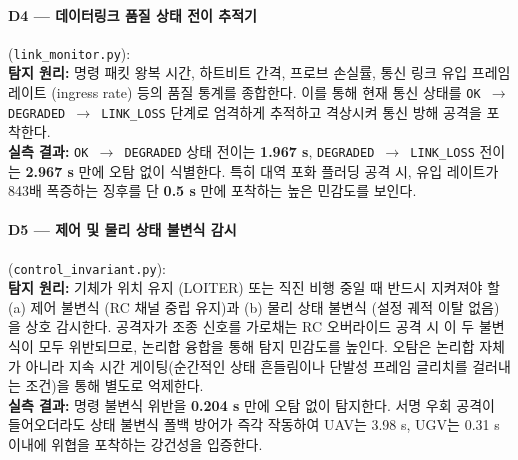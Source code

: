 \paragraph{\textbf{D4 --- 데이터링크 품질 상태 전이 추적기}} (\texttt{link\_monitor.py}): ~\\
\textbf{탐지 원리:} 명령 패킷 왕복 시간, 하트비트 간격, 프로브 손실률, 통신 링크 유입 프레임 레이트 (ingress rate) 등의 품질 통계를 종합한다. 이를 통해 현재 통신 상태를 \texttt{OK $\to$ DEGRADED $\to$ LINK\_LOSS} 단계로 엄격하게 추적하고 격상시켜 통신 방해 공격을 포착한다.\\
\textbf{실측 결과:} \texttt{OK $\to$ DEGRADED} 상태 전이는 \textbf{1.967 s}, \texttt{DEGRADED $\to$ LINK\_LOSS} 전이는 \textbf{2.967 s} 만에 오탐 없이 식별한다. 특히 대역 포화 플러딩 공격 시, 유입 레이트가 843배 폭증하는 징후를 단 \textbf{0.5 s} 만에 포착하는 높은 민감도를 보인다.

\paragraph{\textbf{D5 --- 제어 및 물리 상태 불변식 감시}} (\texttt{control\_invariant.py}): ~\\
\textbf{탐지 원리:} 기체가 위치 유지 (LOITER) 또는 직진 비행 중일 때 반드시 지켜져야 할 (a) 제어 불변식 (RC 채널 중립 유지)과 (b) 물리 상태 불변식 (설정 궤적 이탈 없음)을 상호 감시한다. 공격자가 조종 신호를 가로채는 RC 오버라이드 공격 시 이 두 불변식이 모두 위반되므로, 논리합 융합을 통해 탐지 민감도를 높인다. 오탐은 논리합 자체가 아니라 지속 시간 게이팅(순간적인 상태 흔들림이나 단발성 프레임 글리치를 걸러내는 조건)을 통해 별도로 억제한다.\\
\textbf{실측 결과:} 명령 불변식 위반을 \textbf{0.204 s} 만에 오탐 없이 탐지한다. 서명 우회 공격이 들어오더라도 상태 불변식 폴백 방어가 즉각 작동하여 UAV는 3.98 s, UGV는 0.31 s 이내에 위협을 포착하는 강건성을 입증한다.

